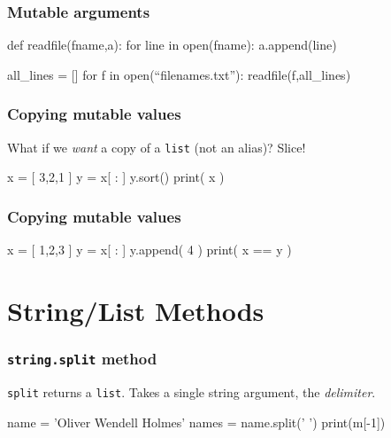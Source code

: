 \documentclass[11pt]{beamer}
\begin{document}
\begin{frame}[fragile]
  \frametitle{Mutable arguments}
  \Enlarge

  \begin{semiverbatim}
def readfile(fname,a):
    for line in open(fname):
        a.append(line)

all_lines = []
for f in open(“filenames.txt”):
    readfile(f,all_lines)
  \end{semiverbatim}
\end{frame}

\begin{frame}[fragile]
  \frametitle{Copying mutable values}
  \Enlarge

  \begin{itemize}
  \myitem  What if we \emph{want} a copy of a \texttt{list} (not an alias)?
  \myitem  Slice!
  \end{itemize}
  \begin{semiverbatim}
x = [ 3,2,1 ]
y = x[ : ]
y.sort()
print( x )
  \end{semiverbatim}
\end{frame}

\begin{frame}[fragile]
  \frametitle{Copying mutable values}
  \Enlarge

  \begin{semiverbatim}
x = [ 1,2,3 ]
y = x[ : ]
y.append( 4 )
print( x == y )
  \end{semiverbatim}
\end{frame}

\section{String/List Methods}

\begin{frame}[fragile]
  \frametitle{\texttt{string.split} method}
  \Enlarge

  \begin{itemize}
  \myitem  \texttt{split} returns a \texttt{list}.
  \myitem  Takes a single string argument, the \emph{delimiter}.
  \end{itemize}
  \begin{semiverbatim}
name = 'Oliver Wendell Holmes'
names = name.split(' ')
print(m[-1])
  \end{semiverbatim}
\end{frame}
\end{document}
